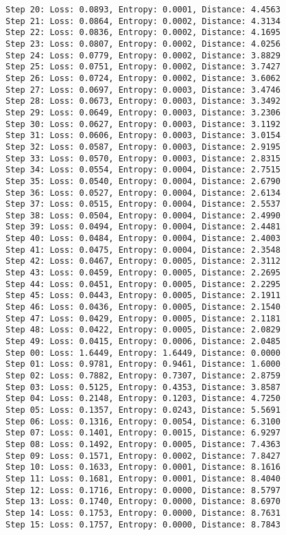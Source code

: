 \documentclass[11pt]{article}
\begin{document}
\begin{Verbatim}[commandchars=\\\{\}]
Step 20: Loss: 0.0893, Entropy: 0.0001, Distance: 4.4563
Step 21: Loss: 0.0864, Entropy: 0.0002, Distance: 4.3134
Step 22: Loss: 0.0836, Entropy: 0.0002, Distance: 4.1695
Step 23: Loss: 0.0807, Entropy: 0.0002, Distance: 4.0256
Step 24: Loss: 0.0779, Entropy: 0.0002, Distance: 3.8829
Step 25: Loss: 0.0751, Entropy: 0.0002, Distance: 3.7427
Step 26: Loss: 0.0724, Entropy: 0.0002, Distance: 3.6062
Step 27: Loss: 0.0697, Entropy: 0.0003, Distance: 3.4746
Step 28: Loss: 0.0673, Entropy: 0.0003, Distance: 3.3492
Step 29: Loss: 0.0649, Entropy: 0.0003, Distance: 3.2306
Step 30: Loss: 0.0627, Entropy: 0.0003, Distance: 3.1192
Step 31: Loss: 0.0606, Entropy: 0.0003, Distance: 3.0154
Step 32: Loss: 0.0587, Entropy: 0.0003, Distance: 2.9195
Step 33: Loss: 0.0570, Entropy: 0.0003, Distance: 2.8315
Step 34: Loss: 0.0554, Entropy: 0.0004, Distance: 2.7515
Step 35: Loss: 0.0540, Entropy: 0.0004, Distance: 2.6790
Step 36: Loss: 0.0527, Entropy: 0.0004, Distance: 2.6134
Step 37: Loss: 0.0515, Entropy: 0.0004, Distance: 2.5537
Step 38: Loss: 0.0504, Entropy: 0.0004, Distance: 2.4990
Step 39: Loss: 0.0494, Entropy: 0.0004, Distance: 2.4481
Step 40: Loss: 0.0484, Entropy: 0.0004, Distance: 2.4003
Step 41: Loss: 0.0475, Entropy: 0.0004, Distance: 2.3548
Step 42: Loss: 0.0467, Entropy: 0.0005, Distance: 2.3112
Step 43: Loss: 0.0459, Entropy: 0.0005, Distance: 2.2695
Step 44: Loss: 0.0451, Entropy: 0.0005, Distance: 2.2295
Step 45: Loss: 0.0443, Entropy: 0.0005, Distance: 2.1911
Step 46: Loss: 0.0436, Entropy: 0.0005, Distance: 2.1540
Step 47: Loss: 0.0429, Entropy: 0.0005, Distance: 2.1181
Step 48: Loss: 0.0422, Entropy: 0.0005, Distance: 2.0829
Step 49: Loss: 0.0415, Entropy: 0.0006, Distance: 2.0485
Step 00: Loss: 1.6449, Entropy: 1.6449, Distance: 0.0000
Step 01: Loss: 0.9781, Entropy: 0.9461, Distance: 1.6000
Step 02: Loss: 0.7882, Entropy: 0.7307, Distance: 2.8759
Step 03: Loss: 0.5125, Entropy: 0.4353, Distance: 3.8587
Step 04: Loss: 0.2148, Entropy: 0.1203, Distance: 4.7250
Step 05: Loss: 0.1357, Entropy: 0.0243, Distance: 5.5691
Step 06: Loss: 0.1316, Entropy: 0.0054, Distance: 6.3100
Step 07: Loss: 0.1401, Entropy: 0.0015, Distance: 6.9297
Step 08: Loss: 0.1492, Entropy: 0.0005, Distance: 7.4363
Step 09: Loss: 0.1571, Entropy: 0.0002, Distance: 7.8427
Step 10: Loss: 0.1633, Entropy: 0.0001, Distance: 8.1616
Step 11: Loss: 0.1681, Entropy: 0.0001, Distance: 8.4040
Step 12: Loss: 0.1716, Entropy: 0.0000, Distance: 8.5797
Step 13: Loss: 0.1740, Entropy: 0.0000, Distance: 8.6970
Step 14: Loss: 0.1753, Entropy: 0.0000, Distance: 8.7631
Step 15: Loss: 0.1757, Entropy: 0.0000, Distance: 8.7843

\end{Verbatim}
\end{document}

